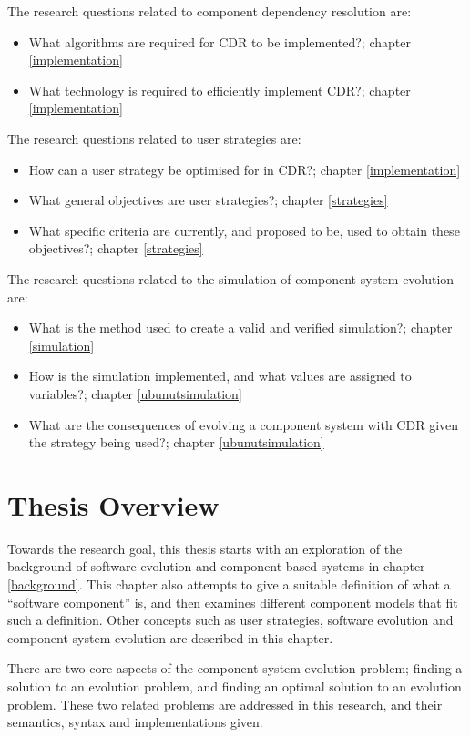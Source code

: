 The research questions related to component dependency resolution are:
\begin{itemize}
  \item What algorithms are required for CDR to be implemented?; chapter \ref{implementation}
  \item What technology is required to efficiently implement CDR?; chapter \ref{implementation}
\end{itemize}

The research questions related to user strategies are: 
\begin{itemize}
	\item How can a user strategy be optimised for in CDR?; chapter \ref{implementation}
	\item What general objectives are user strategies?;  chapter \ref{strategies}
	\item What specific criteria are currently, and proposed to be, used to obtain these objectives?; chapter \ref{strategies}
\end{itemize}

The research questions related to the simulation of component system evolution are: 
\begin{itemize}
	\item What is the method used to create a valid and verified simulation?;  chapter \ref{simulation}
	\item How is the simulation implemented, and what values are assigned to variables?;  chapter \ref{ubunutsimulation}
	\item What are the consequences of evolving a component system with CDR given the strategy being used?;  chapter \ref{ubunutsimulation}
\end{itemize}

\section{Thesis Overview}
Towards the research goal, this thesis starts with an exploration of the background of software evolution and component based systems in chapter \ref{background}.
This chapter also attempts to give a suitable definition of what a ``software component'' is, and then examines different component models that fit such a definition.
Other concepts such as user strategies, software evolution and component system evolution are described in this chapter.

There are two core aspects of the component system evolution problem; 
finding a solution to an evolution problem, and finding an optimal solution to an evolution problem.
These two related problems are addressed in this research, and their semantics, syntax and implementations given.

